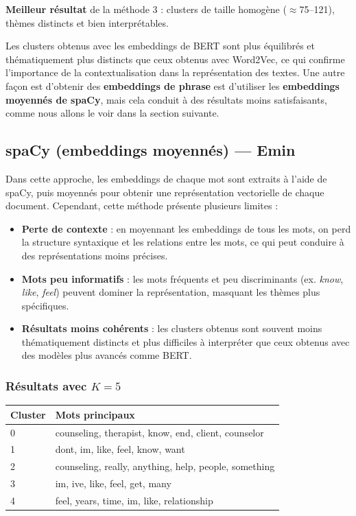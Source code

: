 \documentclass[12pt,a4paper]{report}
\begin{document}
\begin{note}[Remarque]
\textbf{Meilleur résultat} de la méthode 3 : clusters de taille homogène ($\approx$75--121), thèmes distincts et bien interprétables.
\end{note}

Les clusters obtenus avec les embeddings de BERT sont plus équilibrés et thématiquement plus distincts que ceux obtenus avec Word2Vec, 
ce qui confirme l'importance de la contextualisation dans la représentation des textes.
Une autre façon est d'obtenir des \textbf{embeddings de phrase} est d'utiliser les \textbf{embeddings moyennés de spaCy}, mais cela conduit à des résultats moins satisfaisants,
comme nous allons le voir dans la section suivante.

\pagebreak

\subsection{spaCy (embeddings moyennés) — Emin}

Dans cette approche, les embeddings de chaque mot sont extraits à l'aide de spaCy, puis moyennés pour obtenir une représentation vectorielle de chaque document.
Cependant, cette méthode présente plusieurs limites :
\begin{itemize}
  \item \textbf{Perte de contexte} : en moyennant les embeddings de tous les mots, on perd la structure syntaxique et les relations entre les mots, ce qui peut conduire à des représentations moins précises.
  \item \textbf{Mots peu informatifs} : les mots fréquents et peu discriminants (ex. \textit{know}, \textit{like}, \textit{feel}) peuvent dominer la représentation, masquant les thèmes plus spécifiques.
  \item \textbf{Résultats moins cohérents} : les clusters obtenus sont souvent moins thématiquement distincts et plus difficiles à interpréter que ceux obtenus avec des modèles plus avancés comme BERT.
\end{itemize}

\subsubsection*{Résultats avec $K = 5$}

\begin{center}
\begin{tabular}{ll}
\toprule
\textbf{Cluster} & \textbf{Mots principaux} \\
\midrule
0 & counseling, therapist, know, end, client, counselor \\
1 & dont, im, like, feel, know, want \\
2 & counseling, really, anything, help, people, something \\
3 & im, ive, like, feel, get, many \\
4 & feel, years, time, im, like, relationship \\
\bottomrule
\end{tabular}
\end{center}
\end{document}

